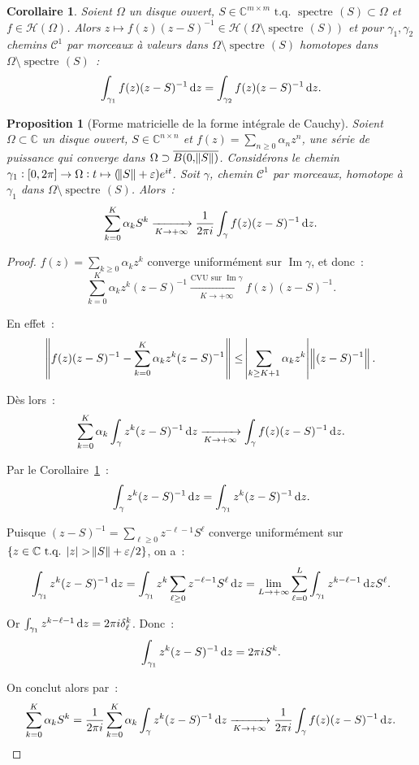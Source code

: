 \documentclass{report}
\DeclareMathOperator{\spectreOperator}{spectre\!}
\DeclareMathOperator{\Imapp}{Im}
\newcommand{\C}{{\mathbb C}}
\newcommand{\tq}{\text{ t.q. }}
\newcommand{\st}{\tq}
\newcommand{\pinfty}{{+\infty}}
\newcommand{\spectre}[1]{{\spectreOperator\left(#1\right)}}
\newtheorem{prp}[thm]{Proposition}
\newtheorem{cor}[thm]{Corollaire}
\theoremstyle{definition}
\theoremstyle{remark}
\begin{document}
\begin{cor}\label{cor:intégrales chemins homotopes} Soient $\Omega$ un disque ouvert, $S \in \C^{m \times m} \st \spectre S \subset \Omega$ et $f \in \mathscr H(\Omega)$.
Alors $z \mapsto f(z)(z-S)^{-1} \in \mathscr H(\Omega \setminus \spectre S)$ et pour $\gamma_1, \gamma_2$ chemins $\mathcal C^1$ par morceaux à valeurs dans $\Omega \setminus \spectre S$
homotopes dans $\Omega \setminus \spectre S$~:
\[\int_{\gamma_1}f(z)(z-S)^{-1}\dif z = \int_{\gamma_2}f(z)(z-S)^{-1}\dif z.\]
\end{cor}

\begin{prp}[Forme matricielle de la forme intégrale de Cauchy] Soient $\Omega \subset \C$ un disque ouvert, $S \in \C^{n \times n}$ et $f(z) = \sum_{n \geq 0}\alpha_nz^n$,
une série de puissance qui converge dans $\Omega \supset \overline {B(0, \norm S)}$. Considérons le chemin $\gamma_1 : [0, 2\pi] \to \Omega : t \mapsto (\norm S + \varepsilon)e^{it}$.
Soit $\gamma$, chemin $\mathcal C^1$ par morceaux, homotope à $\gamma_1$ dans $\Omega \setminus \spectre S$. Alors~:
\[\sum_{k =0}^K\alpha_kS^k \xrightarrow[K \to \pinfty]{} \frac 1{2\pi i}\int_\gamma f(z)(z-S)^{-1}\dif z.\]
\end{prp}

\begin{proof} $f(z) = \sum_{k \geq 0}\alpha_kz^k$ converge uniformément sur $\Imapp \gamma$, et donc~:
\[\sum_{k=0}^K\alpha_kz^k(z-S)^{-1} \xrightarrow[K \to \pinfty]{\text{CVU sur } \Imapp \gamma} f(z)(z-S)^{-1}.\]

En effet~:
\[\norm {f(z)(z-S)^{-1} - \sum_{k=0}^K\alpha_kz^k(z-S)^{-1}} \leq \abs {\sum_{k \geq K+1}\alpha_kz^k}\norm {(z-S)^{-1}}.\]

Dès lors~:
\[\sum_{k=0}^K\alpha_k\int_\gamma z^k(z-S)^{-1}\dif z \xrightarrow[K \to \pinfty]{} \int_\gamma f(z)(z-S)^{-1}\dif z.\]

Par le Corollaire~\ref{cor:intégrales chemins homotopes}~:
\[\int_\gamma z^k(z-S)^{-1}\dif z = \int_{\gamma_1}z^k(z-S)^{-1}\dif z.\]

Puisque $(z-S)^{-1} = \sum_{\ell \geq 0}z^{-\ell-1}S^\ell$ converge uniformément sur $\{z \in \C \st \abs z > \norm S + \varepsilon/2\}$, on a~:
\[\int_{\gamma_1}z^k(z-S)^{-1}\dif z = \int_{\gamma_1}z^k\sum_{\ell \geq 0}z^{-\ell-1}S^\ell\dif z = \lim_{L \to \pinfty}\sum_{\ell=0}^L\int_{\gamma_1}z^{k-\ell-1}\dif zS^\ell.\]

Or $\int_{\gamma_1}z^{k-\ell-1}\dif z = 2\pi i \delta_\ell^k$. Donc~:
\[\int_{\gamma_1}z^k(z-S)^{-1}\dif z = 2\pi iS^k.\]

On conclut alors par~:
\[\sum_{k=0}^K\alpha_kS^k = \frac 1{2\pi i}\sum_{k=0}^K\alpha_k\int_\gamma z^k(z-S)^{-1}\dif z \xrightarrow[K \to \pinfty]{} \frac 1{2\pi i}\int_\gamma f(z)(z-S)^{-1}\dif z.\]
\end{proof}
\end{document}
